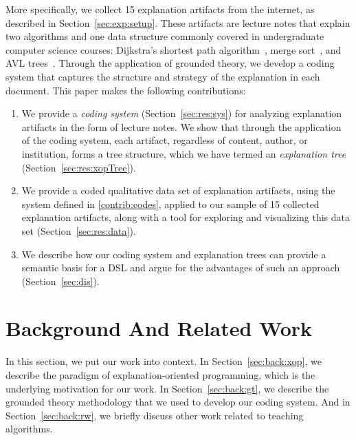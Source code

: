 \documentclass[sigconf]{acmart}
\begin{document}
More specifically, we collect 15 explanation artifacts from the internet, as
described in Section~\ref{sec:exp:setup}. These artifacts are lecture notes
that explain two algorithms and one data structure commonly covered in
undergraduate computer science courses: Dijkstra's shortest path
algorithm~\cite[pp.~137--142]{KT06}, merge sort~\cite[210--214]{KT06}, and AVL
trees~\cite[pp.~458--475]{KnuthArt3}.
%
Through the application of grounded theory, we develop a coding system that
captures the structure and strategy of the explanation in each document.
This paper makes the following contributions:
%
\begin{enumerate}[label=C\arabic*.,ref=C\arabic*,leftmargin=*]


\item \label{contrib:codes}
%
We provide a \emph{coding system} (Section~\ref{sec:res:sys}) for analyzing
explanation artifacts in the form of lecture notes. We show that through the
application of the coding system, each artifact, regardless of content, author,
or institution, forms a tree structure, which we have termed an
\emph{explanation tree} (Section~\ref{sec:res:xopTree}).

\item \label{contrib:data}
%
We provide a coded qualitative data set of explanation artifacts, using the
system defined in \ref{contrib:codes}, applied to our sample of 15 collected
explanation artifacts, along with a tool for exploring and visualizing this
data set (Section~\ref{sec:res:data}).

\item \label{contrib:DSL}
%
We describe how our coding system and explanation trees can provide a semantic
basis for a DSL and argue for the advantages of such an approach
(Section~\ref{sec:dis}).
%
\end{enumerate}

\noindent

\section{Background And Related Work}
\label{sec:back}

In this section, we put our work into context.
%
In Section~\ref{sec:back:xop}, we describe the paradigm of explanation-oriented
programming, which is the underlying motivation for our work.
%
In Section~\ref{sec:back:gt}, we describe the grounded theory methodology that
we used to develop our coding system.
%
And in Section~\ref{sec:back:rw}, we briefly discuss other work related to
teaching algorithms.
\end{document}
